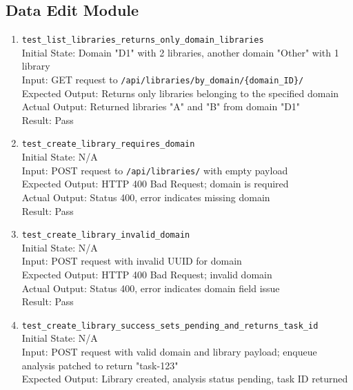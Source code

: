 \documentclass[12pt, titlepage]{article}
\begin{document}
\subsection{Data Edit Module}
  \begin{enumerate}
    \item \texttt{test\_list\_libraries\_returns\_only\_domain\_libraries} \label{test-list-libraries-returns-only-domain-libraries}
      \\Initial State: Domain "D1" with 2 libraries, another domain "Other" with 1 library
      \\Input: GET request to \texttt{/api/libraries/by\_domain/\{domain\_ID\}/}
      \\Expected Output: Returns only libraries belonging to the specified domain
      \\Actual Output: Returned libraries "A" and "B" from domain "D1"
      \\Result: Pass
    \item \texttt{test\_create\_library\_requires\_domain} \label{test-create-library-requires-domain}
      \\Initial State: N/A
      \\Input: POST request to \texttt{/api/libraries/} with empty payload
      \\Expected Output: HTTP 400 Bad Request; domain is required
      \\Actual Output: Status 400, error indicates missing domain
      \\Result: Pass
    \item \texttt{test\_create\_library\_invalid\_domain} \label{test-create-library-invalid-domain}
      \\Initial State: N/A
      \\Input: POST request with invalid UUID for domain
      \\Expected Output: HTTP 400 Bad Request; invalid domain
      \\Actual Output: Status 400, error indicates domain field issue
      \\Result: Pass
    \item \texttt{test\_create\_library\_success\_sets\_pending\_and\_returns\_task\_id} \label{test-create-library-success-sets-pending-and-returns-task-id}
      \\Initial State: N/A
      \\Input: POST request with valid domain and library payload; enqueue analysis patched to return "task-123"
      \\Expected Output: Library created, analysis status pending, task ID returned

\end{enumerate}
\end{document}
